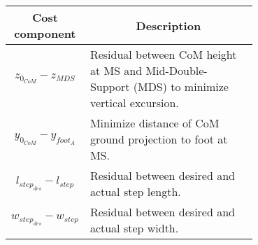 \small
\begin{tabular}{|c|m{0.7\linewidth}|}
	\hline
Cost component	& \multicolumn{1}{c|}{Description} \\
	\hline
$ z_{0_{CoM}} - z_{MDS} $	& Residual between CoM height at MS and Mid-Double-Support (MDS) to minimize vertical excursion. \\
	\hline
$ y_{0_{CoM}} - y_{foot_A} $	& Minimize distance of CoM ground projection to foot at MS. \\
	\hline
$ l_{step_{des}} - l_{step} $	& Residual between desired and actual step length. \\
	\hline
$ w_{step_{des}} - w_{step} $	& Residual between desired and actual step width. \\
	\hline
\end{tabular}




%
